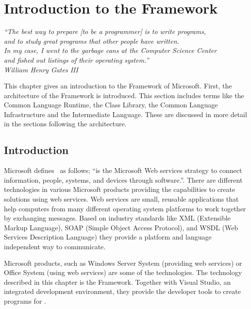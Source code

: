 \chapter{Introduction to the \dotNET Framework}
\begin{flushright}
\textit{``The best way to prepare [to be a programmer] is to write programs,}\\
\textit{and to study great programs that other people have written.}\\
\textit{In my case, I went to the garbage cans at the Computer Science Center}\\
\textit{and fished out listings of their operating system.''}\\
\textit{William Henry Gates III}\\
\end{flushright}

\label{chp:dotnet_platform}

This chapter gives an introduction to the \dotNET Framework of Microsoft. First, the architecture of the \dotNET Framework is introduced. This section includes terms like the Common Language Runtime, the \dotNET Class Library, the Common Language Infrastructure and the Intermediate Language. These are discussed in more detail in the sections following the architecture.

%
%
\section{Introduction}
Microsoft defines~\cite{Microsoft03-5} \dotNET as follows; ``\dotNET is the Microsoft Web services strategy to connect information, people, systems, and devices through software.''. There are different \dotNET technologies in various Microsoft products providing the capabilities to create solutions using web services. 
Web services are small, reusable applications that help computers from many different operating system platforms to work together by exchanging messages. Based on industry standards like XML (Extensible Markup Language), SOAP (Simple Object Access Protocol), and WSDL (Web Services Description Language) they provide a platform and language independent way to communicate.

Microsoft products, such as Windows Server System (providing web services) or Office System (using web services) are some of the \dotNET technologies. The technology described in this chapter is the \dotNET Framework. Together with Visual Studio, an integrated development environment, they provide the developer tools to create programs for \dotNET. 

